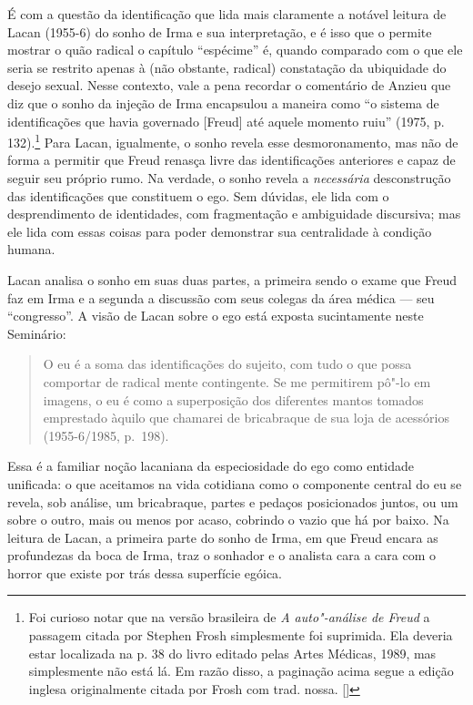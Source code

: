 É com a questão da identificação que lida mais claramente a notável
leitura de Lacan (1955-6) do sonho de Irma e sua interpretação, e é isso
que o permite mostrar o quão radical o capítulo ``espécime'' é, quando
comparado com o que ele seria se restrito apenas à (não obstante,
radical) constatação da ubiquidade do desejo sexual. Nesse contexto,
vale a pena recordar o comentário de Anzieu que diz que o sonho da
injeção de Irma encapsulou a maneira como ``o sistema de identificações
que havia governado {[}Freud{]} até aquele momento ruiu'' (1975, p.
132).\footnote{Foi curioso notar que na versão brasileira de \emph{A
  auto"-análise de Freud} a passagem citada por Stephen Frosh simplesmente
  foi suprimida. Ela deveria estar localizada na p. 38 do livro editado
  pelas Artes Médicas, 1989, mas simplesmente não está lá. Em razão
  disso, a paginação acima segue a edição inglesa originalmente citada
  por Frosh com trad. nossa. []} Para Lacan, igualmente, o sonho
revela esse desmoronamento, mas não de forma a permitir que Freud
renasça livre das identificações anteriores e capaz de seguir seu
próprio rumo. Na verdade, o sonho revela a \emph{necessária}
desconstrução das identificações que constituem o ego. Sem dúvidas, ele
lida com o desprendimento de identidades, com fragmentação e ambiguidade
discursiva; mas ele lida com essas coisas para poder demonstrar sua
centralidade à condição humana.

Lacan analisa o sonho em suas duas partes, a primeira sendo o exame que
Freud faz em Irma e a segunda a discussão com seus colegas da área
médica --- seu ``congresso''. A visão de Lacan sobre o ego está exposta
sucintamente neste Seminário:

\begin{quote}
O eu é a soma das identificações do sujeito, com tudo o que possa
comportar de radical mente contingente. Se me permitirem pô"-lo em
imagens, o eu é como a superposição dos diferentes mantos tomados
emprestado àquilo que chamarei de bricabraque de sua loja de acessórios
(1955-6/1985, p.~198).
\end{quote}

Essa é a familiar noção lacaniana da especiosidade do ego como entidade
unificada: o que aceitamos na vida cotidiana como o componente central
do eu se revela, sob análise, um bricabraque, partes e pedaços
posicionados juntos, ou um sobre o outro, mais ou menos por acaso,
cobrindo o vazio que há por baixo. Na leitura de Lacan, a primeira parte
do sonho de Irma, em que Freud encara as profundezas da boca de Irma,
traz o sonhador e o analista cara a cara com o horror que existe por
trás dessa superfície egóica.

